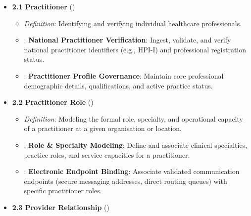 \begin{itemize}

\item 
\textbf{2.1 Practitioner} (\texttt{})


\begin{itemize}

\item 
\emph{Definition}: Identifying and verifying individual healthcare professionals.



\item 
\texttt{}: \textbf{National Practitioner Verification}: Ingest, validate, and verify national practitioner identifiers (e.g., HPI-I) and professional registration status.



\item 
\texttt{}: \textbf{Practitioner Profile Governance}: Maintain core professional demographic details, qualifications, and active practice status.



\end{itemize}


\item 
\textbf{2.2 Practitioner Role} (\texttt{})


\begin{itemize}

\item 
\emph{Definition}: Modeling the formal role, specialty, and operational capacity of a practitioner at a given organisation or location.



\item 
\texttt{}: \textbf{Role \& Specialty Modeling}: Define and associate clinical specialties, practice roles, and service capacities for a practitioner.



\item 
\texttt{}: \textbf{Electronic Endpoint Binding}: Associate validated communication endpoints (secure messaging addresses, direct routing queues) with specific practitioner roles.



\end{itemize}


\item 
\textbf{2.3 Provider Relationship} (\texttt{})



\end{itemize}
